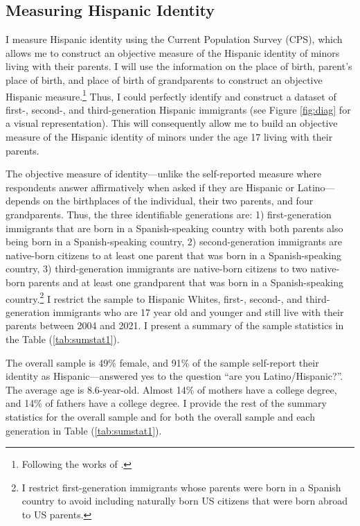 \documentclass[12pt,english]{article}
\begin{document}
\subsection{Measuring Hispanic Identity}\label{subsec:cps}

I measure Hispanic identity using the Current Population Survey (CPS), which allows me to construct an objective measure of the Hispanic identity of minors living with their parents. I will use the information on the place of birth, parent's place of birth, and place of birth of grandparents to construct an objective Hispanic measure.\footnote{Following the works of \textcite{antmanEthnicAttritionObserved2016,antmanEthnicAttritionAssimilation2020}.} Thus, I could perfectly identify and construct a dataset of first-, second-, and third-generation Hispanic immigrants (see Figure \ref{fig:diag} for a visual representation). This will consequently allow me to build an objective measure of the Hispanic identity of minors under the age 17 living with their parents. 

The objective measure of identity---unlike the self-reported measure where respondents answer affirmatively when asked if they are Hispanic or Latino---depends on the birthplaces of the individual, their two parents, and four grandparents. Thus, the three identifiable generations are: 1) first-generation immigrants that are born in a Spanish-speaking country with both parents also being born in a Spanish-speaking country, 2) second-generation immigrants are native-born citizens to at least one parent that was born in a Spanish-speaking country, 3) third-generation immigrants are native-born citizens to two native-born parents and at least one grandparent that was born in a Spanish-speaking country.\footnote{I restrict first-generation immigrants whose parents were born in a Spanish country to avoid including naturally born US citizens that were born abroad to US parents.} I restrict the sample to Hispanic Whites, first-, second-, and third-generation immigrants who are 17 year old and younger and still live with their parents between 2004 and 2021. I present a summary of the sample statistics in the Table (\ref{tab:sumstat1}). 

The overall sample is 49\% female, and 91\% of the sample self-report their identity as Hispanic---answered yes to the question ``are you Latino/Hispanic?''. The average age is 8.6-year-old. Almost 14\% of mothers have a college degree, and 14\% of fathers have a college degree. I provide the rest of the summary statistics for the overall sample and for both the overall sample and each generation in Table (\ref{tab:sumstat1}). 
\end{document}
